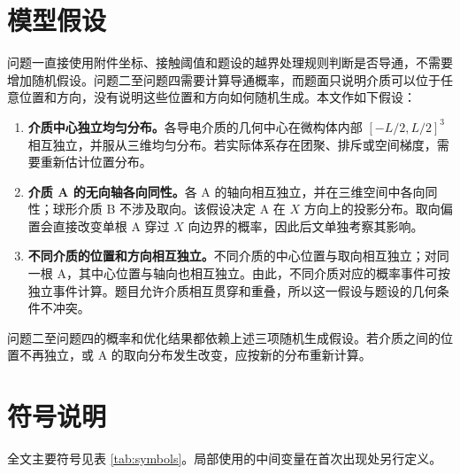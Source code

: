 \documentclass[withoutpreface,bwprint]{cumcmthesis}
\begin{document}
\section{模型假设}

问题一直接使用附件坐标、接触阈值和题设的越界处理规则判断是否导通，不需要增加随机假设。问题二至问题四需要计算导通概率，而题面只说明介质可以位于任意位置和方向，没有说明这些位置和方向如何随机生成。本文作如下假设：

\begin{enumerate}[label=\arabic*)]
  \item \textbf{介质中心独立均匀分布。}各导电介质的几何中心在微构体内部 $[-L/2,L/2]^3$ 相互独立，并服从三维均匀分布。若实际体系存在团聚、排斥或空间梯度，需要重新估计位置分布。
  \item \textbf{介质 A 的无向轴各向同性。}各 A 的轴向相互独立，并在三维空间中各向同性；球形介质 B 不涉及取向。该假设决定 A 在 $X$ 方向上的投影分布。取向偏置会直接改变单根 A 穿过 $X$ 向边界的概率，因此后文单独考察其影响。
  \item \textbf{不同介质的位置和方向相互独立。}不同介质的中心位置与取向相互独立；对同一根 A，其中心位置与轴向也相互独立。由此，不同介质对应的概率事件可按独立事件计算。题目允许介质相互贯穿和重叠，所以这一假设与题设的几何条件不冲突。
\end{enumerate}

问题二至问题四的概率和优化结果都依赖上述三项随机生成假设。若介质之间的位置不再独立，或 A 的取向分布发生改变，应按新的分布重新计算。


\section{符号说明}

全文主要符号见表 \ref{tab:symbols}。局部使用的中间变量在首次出现处另行定义。
\end{document}
